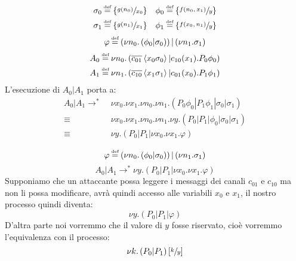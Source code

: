 \documentclass{beamer}
\theoremstyle{plain}
\theoremstyle{definition}
\theoremstyle{remark}
\newcommand{\obar}[1]{\overline{#1}}
\newcommand{\set}[1]{\left\{#1\right\}}
\newcommand{\pa}[1]{\left(#1\right)}
\newcommand{\ang}[1]{\left<#1\right>}
\newcommand{\bra}[1]{\left[#1\right]}
\newcommand*{\eqdef}{\ensuremath{\overset{\mathclap{\text{\tiny def}}}{=}}}
\begin{document}
\begin{frame}
    \begin{align*}
    \sigma _0 & \eqdef \set{\sfrac{g(n_0)}{x_0}} & \phi _0 & \eqdef
                                                             \set{\sfrac{
                                                             f(n_0,x_1)}{y}} \\
    \sigma _1 & \eqdef \set{\sfrac{g(n_1)}{x_1}} & \phi _1 & \eqdef
                                                             \set{\sfrac{
                                                             f(x_0,n_1)}{y}} 
  \end{align*}
  \[ \varphi \eqdef \pa{ \nu n_0.\pa{ \phi _0 | \sigma _0}} | \pa{ \nu
      n_1 . \sigma _1 } \]
  \begin{align*}
    A_0 &\eqdef \nu n_0.\pa{ \obar{c_{01}}\ang{x_0\sigma _0} |
          c_{10}(x_1).P_0\phi _0 } \\
    A_1 &\eqdef \nu n_1.\pa{ \obar{c_{10}}\ang{x_1\sigma _1} |
          c_{01}(x_0).P_1\phi _1 }
  \end{align*}
  L'esecuzione di $A_0|A_1$ porta a:
  \begin{align*}
    A_0 | A_1 \rightarrow ^* \;& \nu x_0.\nu x_1.\nu n_0.\nu
                            n_1.\pa{ P_0 \phi _0 | P_1 \phi _1 |
                            \sigma _0 | \sigma _1 } \\
     \equiv \; &\nu x_0.\nu x_1.\nu n_0.\nu n_1.\nu y.\pa{ P_0 | P_1 |
      \phi _0 | \sigma _0 | \sigma _1 } \\
    \equiv \; & \nu y.\pa{ P_0| P_1 | \nu x_0. \nu x_1. \varphi }
  \end{align*}
\end{frame}

\begin{frame}
  \[ \varphi \eqdef \pa{ \nu n_0.\pa{ \phi _0 | \sigma _0}} | \pa{ \nu
      n_1 . \sigma _1 } \]
  \[ A_0|A_1 \rightarrow ^* \nu y.\pa{ P_0| P_1 | \nu x_0. \nu x_1. \varphi } \]
  Supponiamo che un attaccante possa leggere i messaggi dei canali
  $c_{01}$ e $c_{10}$ ma non li possa modificare, avr\`a quindi
  accesso alle variabili $x_0$ e $x_1$, il nostro processo quindi
  diventa:
  \[ \nu y.\pa{ P_0| P_1 | \varphi } \]
  D'altra parte noi vorremmo che il valore di $y$ fosse riservato,
  cio\`e vorremmo l'equivalenza con il processo:
  \[ \nu k.\pa{P_0|P_1}\bra{\sfrac{k}{y}} \]
\end{frame}
\end{document}
